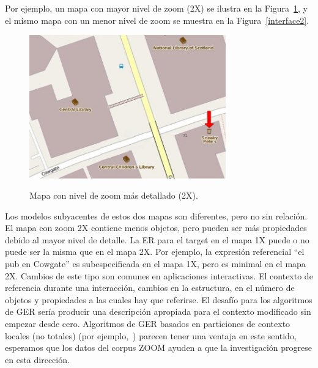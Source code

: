 Por ejemplo, un mapa con mayor nivel de zoom (2X) se ilustra en la Figura~\ref{fig-with-zoom}, y el mismo mapa con un menor nivel de zoom se muestra en la Figura~\ref{interface2}.

\begin{figure}[ht]
\begin{center}
\includegraphics[width=8.5cm]{images/with-zoom.jpg}\\[0pt]
\caption{Mapa con nivel de zoom m\'as detallado (2X).}
\label{fig-with-zoom}
\end{center}
\end{figure}


 Los modelos subyacentes de estos dos mapas son diferentes, pero no sin relaci\'on. El mapa con zoom 2X contiene menos objetos, pero pueden ser m\'as propiedades debido al mayor nivel de detalle. La ER para el target en el mapa 1X puede o no puede ser la misma que en el mapa 2X. Por ejemplo, la expresi\'on referencial ``el pub en Cowgate'' es subespecificada en el mapa 1X, pero es minimal en el mapa 2X. Cambios de este tipo son comunes en aplicaciones interactivas. El contexto de referencia durante una interacci\'on, cambios en la estructura, en el n\'umero de objetos y propiedades a las cuales hay que referirse. El desaf\'{i}o para los algoritmos de GER ser\'{i}a producir una descripci\'on apropiada para el contexto modificado sin empezar desde cero. Algoritmos de GER basados en particiones de  contexto locales (no totales) (por ejemplo,~\cite{areces08}) parecen tener una ventaja en este sentido, esperamos que los datos del corpus ZOOM ayuden a que la investigaci\'on progrese en esta direcci\'on.


